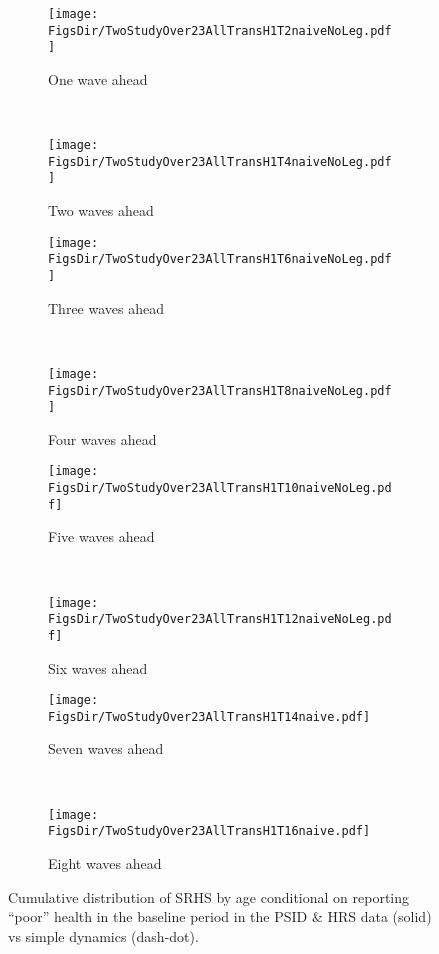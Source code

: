 \documentclass[12pt,pdftex,letterpaper]{article}
\newcommand{\RootDir}{..}
\newcommand{\FigsDir}{\RootDir/Figures}
\begin{document}
\begin{figure}
	\centering
	\begin{subfigure}[b]{0.48\textwidth}
		\texttt{[image: \\FigsDir/TwoStudyOver23AllTransH1T2naiveNoLeg.pdf]}
		\caption{One wave ahead}\label{fig:Naive1AheadPoor}
	\end{subfigure}
	~
	\begin{subfigure}[b]{0.48\textwidth}
		\texttt{[image: \\FigsDir/TwoStudyOver23AllTransH1T4naiveNoLeg.pdf]}
		\caption{Two waves ahead}\label{fig:Naive2AheadPoor}
	\end{subfigure}
	
	\begin{subfigure}[b]{0.48\textwidth}
		\texttt{[image: \\FigsDir/TwoStudyOver23AllTransH1T6naiveNoLeg.pdf]}
		\caption{Three waves ahead}\label{fig:Naive3AheadPoor}
	\end{subfigure}
	~
	\begin{subfigure}[b]{0.48\textwidth}
		\texttt{[image: \\FigsDir/TwoStudyOver23AllTransH1T8naiveNoLeg.pdf]}
		\caption{Four waves ahead}\label{fig:Naive4AheadPoor}
	\end{subfigure}
	
	\begin{subfigure}[b]{0.48\textwidth}
		\texttt{[image: \\FigsDir/TwoStudyOver23AllTransH1T10naiveNoLeg.pdf]}
		\caption{Five waves ahead}\label{fig:Naive5AheadPoor}
	\end{subfigure}
	~
	\begin{subfigure}[b]{0.48\textwidth}
		\texttt{[image: \\FigsDir/TwoStudyOver23AllTransH1T12naiveNoLeg.pdf]}
		\caption{Six waves ahead}\label{fig:Naive6AheadPoor}
	\end{subfigure}
	
	\begin{subfigure}[b]{0.48\textwidth}
		\texttt{[image: \\FigsDir/TwoStudyOver23AllTransH1T14naive.pdf]}
		\caption{Seven waves ahead}\label{fig:Naive7AheadPoor}
	\end{subfigure}
	~
	\begin{subfigure}[b]{0.48\textwidth}
		\texttt{[image: \\FigsDir/TwoStudyOver23AllTransH1T16naive.pdf]}
		\caption{Eight waves ahead}\label{fig:Naive8AheadPoor}
	\end{subfigure}
	\caption{Cumulative distribution of SRHS by age conditional on reporting ``poor'' health in the baseline period in the PSID \& HRS data (solid) vs simple dynamics (dash-dot).}\label{fig:NaiveTransPR}
\end{figure}
\end{document}
